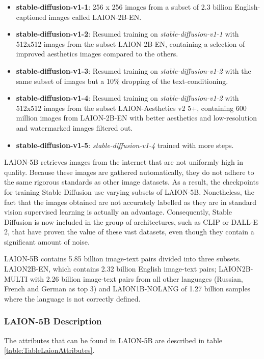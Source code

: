 \begin{itemize}
  \item \textbf{stable-diffusion-v1-1}: 256 x 256 images from a subset of 2.3 billion English-captioned images called LAION-2B-EN.
  \item \textbf{stable-diffusion-v1-2}: Resumed training on \textit{stable-diffusion-v1-1} with 512x512 images from the subset LAION-2B-EN, containing a selection of improved aesthetics images compared to the others.
  \item \textbf{stable-diffusion-v1-3}: Resumed training on \textit{stable-diffusion-v1-2} with the same subset of images but a 10\% dropping of the text-conditioning.
  \item \textbf{stable-diffusion-v1-4}: Resumed training on \textit{stable-diffusion-v1-2} with 512x512 images from the subset LAION-Aesthetics v2 5+, containing 600 million images from LAION-2B-EN with better aesthetics and low-resolution and watermarked images filtered out.
  \item \textbf{stable-diffusion-v1-5}: \textit{stable-diffusion-v1-4} trained with more steps.
\end{itemize}

LAION-5B retrieves images from the internet that are not uniformly high in quality. Because these images are gathered automatically, they do not adhere to the same rigorous standards as other image datasets. As a result, the checkpoints for training Stable Diffusion use varying subsets of LAION-5B. Nonetheless, the fact that the images obtained are not accurately labelled as they are in standard vision supervised learning is actually an advantage. Consequently, Stable Diffusion is now included in the group of architectures, such as CLIP or DALL-E 2, that have proven the value of these vast datasets, even though they contain a significant amount of noise.

LAION-5B contains 5.85 billion image-text pairs divided into three subsets. LAION2B-EN, which contains 2.32 billion English image-text pairs; LAION2B-MULTI with 2.26 billion image-text pairs from all other languages (Russian, French and German as top 3) and LAION1B-NOLANG of 1.27 billion samples where the language is not correctly defined. 

\subsubsection{LAION-5B Description}

The attributes that can be found in LAION-5B are described in table \ref{table:TableLaionAttributes}.


